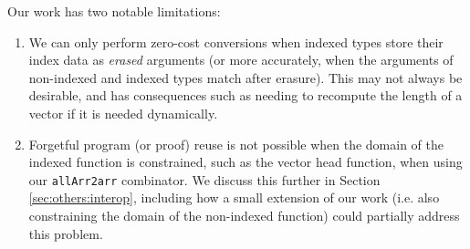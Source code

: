 \documentclass[acmsmall]{acmart}\settopmatter{}
\newcommand{\refsec}[1]{Section \ref{sec:#1}}
\begin{document}
Our work has two notable limitations:
\begin{enumerate}
\item We can only perform zero-cost conversions when indexed types
  store their index data as \textit{erased} arguments
  (or more accurately, when the arguments of
  non-indexed and indexed types match after erasure). This may not
  always be desirable, and has consequences such as needing to
  recompute the length of a vector if it is needed dynamically.
\item Forgetful program (or proof) reuse is not possible when the domain of the
  indexed function is constrained, such as the vector head function, when using
  our \verb;allArr2arr; combinator. We discuss this further in
  \refsec{others:interop}, including how a small extension of our work
  (i.e. also constraining the domain of the non-indexed function)
  could partially address this problem.
\end{enumerate}
\end{document}
